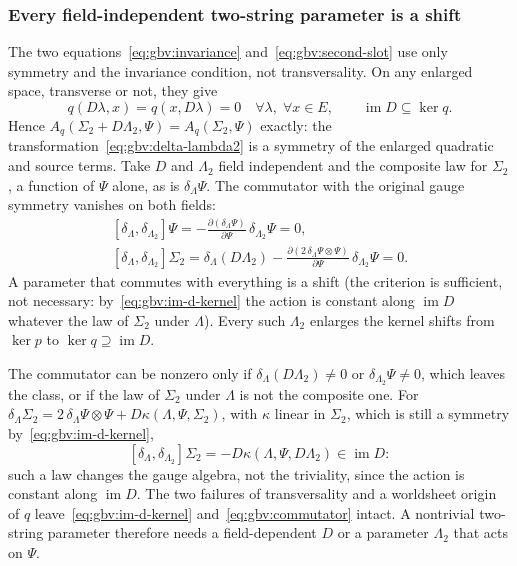 \subsubsection{Every field-independent two-string parameter is a shift}
\label{sec:gauge-bv:shift}


The two equations~\eqref{eq:gbv:invariance} and~\eqref{eq:gbv:second-slot} use only symmetry and the invariance condition, not transversality.
On any enlarged space, transverse or not, they give
\begin{equation}
  \label{eq:gbv:im-d-kernel}
  q(D \lambda, x)
    = q(x, D \lambda)
    = 0
  \quad
  \forall \lambda,
  \;
  \forall x \in E,
  \qquad
  \operatorname{im} D
    \subseteq \ker q.
\end{equation}
Hence $A_q(\Sigma_2 + D \Lambda_2, \Psi) = A_q(\Sigma_2, \Psi)$ exactly: the transformation~\eqref{eq:gbv:delta-lambda2} is a symmetry of the enlarged quadratic and source terms.
Take $D$ and $\Lambda_2$ field independent and the composite law for $\Sigma_2$, a function of $\Psi$ alone, as is $\delta_\Lambda \Psi$.
The commutator with the original gauge symmetry vanishes on both fields:
\begin{equation}
  \label{eq:gbv:commutator}
  \begin{gathered}
  [\delta_\Lambda, \delta_{\Lambda_2}] \Psi
    = - \frac{\partial (\delta_\Lambda \Psi)}{\partial \Psi} \, \delta_{\Lambda_2} \Psi
    = 0,
  \\
  [\delta_\Lambda, \delta_{\Lambda_2}] \Sigma_2
    = \delta_\Lambda (D \Lambda_2)
      - \frac{\partial (2 \, \delta_\Lambda \Psi \otimes \Psi)}{\partial \Psi} \, \delta_{\Lambda_2} \Psi
    = 0.
  \end{gathered}
\end{equation}
A parameter that commutes with everything is a shift (the criterion is sufficient, not necessary: by~\eqref{eq:gbv:im-d-kernel} the action is constant along $\operatorname{im} D$ whatever the law of $\Sigma_2$ under $\Lambda$).
Every such $\Lambda_2$ enlarges the kernel shifts from $\ker p$ to $\ker q \supseteq \operatorname{im} D$.

The commutator can be nonzero only if $\delta_\Lambda (D \Lambda_2) \neq 0$ or $\delta_{\Lambda_2} \Psi \neq 0$, which leaves the class, or if the law of $\Sigma_2$ under $\Lambda$ is not the composite one.
For $\delta_\Lambda \Sigma_2 = 2 \, \delta_\Lambda \Psi \otimes \Psi + D \kappa(\Lambda, \Psi, \Sigma_2)$, with $\kappa$ linear in $\Sigma_2$, which is still a symmetry by~\eqref{eq:gbv:im-d-kernel},
\begin{equation}
  \label{eq:gbv:noncomposite}
  [\delta_\Lambda, \delta_{\Lambda_2}] \Sigma_2
    = - D \kappa(\Lambda, \Psi, D \Lambda_2)
    \in \operatorname{im} D:
\end{equation}
such a law changes the gauge algebra, not the triviality, since the action is constant along $\operatorname{im} D$.
The two failures of transversality and a worldsheet origin of $q$ leave~\eqref{eq:gbv:im-d-kernel} and~\eqref{eq:gbv:commutator} intact.
A nontrivial two-string parameter therefore needs a field-dependent $D$ or a parameter $\Lambda_2$ that acts on $\Psi$.

